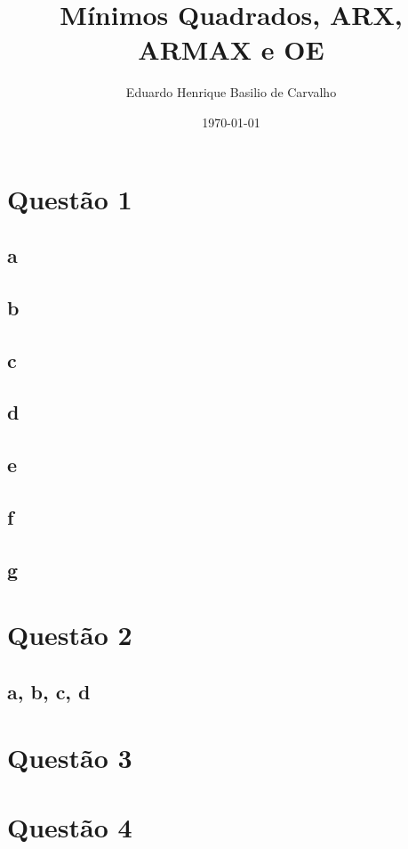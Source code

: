 \documentclass{article}
\title{Mínimos Quadrados, ARX, ARMAX e OE}
\author{Eduardo Henrique Basilio de Carvalho}
\date{\today}
\begin{document}
\maketitle

\section*{Questão 1}

\subsection*{a}

\subsection*{b}

\subsection*{c}

\subsection*{d}

\subsection*{e}

\subsection*{f}

\subsection*{g}

\section*{Questão 2}

\subsection*{a, b, c, d}

\section*{Questão 3}

\section*{Questão 4}
\end{document}
